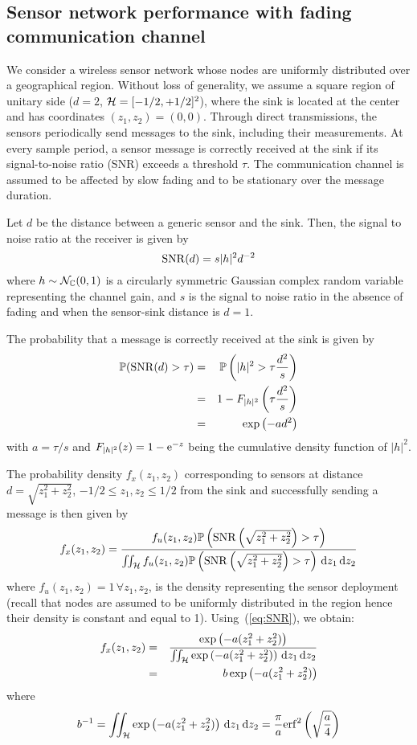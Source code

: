 \documentclass[11pt, draftcls, onecolumn, a4paper]{IEEEtran}
\newcommand{\CC}{\mathbb{C}} \newcommand{\EE}{\mathbb{E}} \newcommand{\PP}{\mathbb{P}} \newcommand{\RR}{\mathbb{R}} \newcommand{\ZZ}{\mathbb{Z}}
\newcommand{\ee}{{\rm e}}
\newcommand{\erf}{{\rm erf}}
\newcommand{\Hc}{{\cal H}}
\newcommand{\Nc}{{\cal N}}
\def\non{\nonumber\\}
\begin{document}
\subsection{Sensor network performance with fading communication channel}
We consider a wireless sensor network whose nodes are uniformly
distributed over a geographical region.  Without loss of generality,
we assume a square region of unitary side ($d=2$,
$\Hc=[-1/2,+1/2]^2$), where the sink is located at the center and has
coordinates $(z_1,z_2)=(0,0)$.  Through direct transmissions, the
sensors periodically send messages to the sink, including their
measurements.  At every sample period, a sensor message is correctly
received at the sink if its signal-to-noise ratio (SNR) exceeds a
threshold $\tau$.  The communication channel is assumed to be affected
by slow fading and to be stationary over the message duration.

Let $d$ be the distance between a generic sensor and the sink. Then, the signal
to noise ratio at the receiver is given by 
\[ {\rm SNR}(d) = s |h|^2d^{-2} \]
where $h\sim \Nc_\CC(0,1)$ is a circularly symmetric
Gaussian complex random variable representing the channel gain, and
 $s$ is the signal to noise ratio in the absence of fading and
when the sensor-sink  distance is $d=1$.

The probability that a message is correctly received at the sink is
given by
\begin{eqnarray} 
 \PP({\rm SNR}(d) > \tau) 
&=& \PP\left(|h|^2 > \tau\frac{d^2}{s}\right) \non
&=& 1-F_{|h|^2}\left( \tau\frac{d^2}{s} \right) \non
&=& \exp\left(-a d^2\right)
\label{eq:SNR}
\end{eqnarray}
with $a=\tau/s$ and $F_{|h|^2}(z) = 1-\ee^{-z}$ being the cumulative density
function of $|h|^2$.

The probability density $f_{x}(z_1,z_2)$ corresponding to
sensors at distance $d=\sqrt{z_1^2+z_2^2}$, $-1/2\le
z_1,z_2\le 1/2$ from the sink and successfully sending a message 
is then given by
\[ f_{x}(z_1,z_2) = \frac{f_u(z_1,z_2) \PP\left({\rm SNR}\left(\sqrt{z_1^2+z_2^2}\right) > \tau\right)}{\iint_{\Hc} f_u(z_1,z_2) \PP\left({\rm SNR}\left(\sqrt{z_1^2+z_2^2}\right) > \tau\right)\dd z_1 \dd z_2} \]
where $f_u(z_1,z_2)=1\, \forall z_1,z_2$, 
is the density representing the sensor deployment (recall that  
nodes are assumed to be uniformly distributed in the region
hence their density is constant and equal to 1).
Using~(\ref{eq:SNR}), we obtain:
\begin{eqnarray} 
f_{x}(z_1,z_2) 
&=& \frac{\exp\left(-a(z_1^2+z_2^2)\right)}{\iint_{\Hc}\exp\left(- a(z_1^2+z_2^2)\right) \dd z_1 \dd z_2} \non
&=& b\exp\left(-a(z_1^2+z_2^2)\right)
\label{eq:f_xi}
\end{eqnarray}
where
\[ b^{-1} = \iint_{\Hc}\exp\left(- a(z_1^2+z_2^2)\right) \dd z_1 \dd z_2 = \frac{\pi}{a}\erf^2\left(\sqrt{\frac{a}{4}}\right) \]
\end{document}
